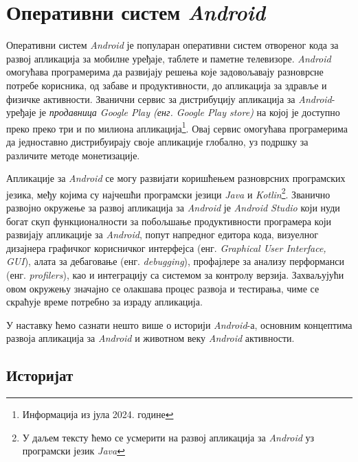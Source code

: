 \documentclass[12pt,oneside]{memoir}
\begin{document}



\chapter{Оперативни систем \textit{Android}} \label{chapter:android-theory}

Оперативни систем \textit{Android} је популаран оперативни систем отвореног кода за развој апликација за мобилне уређаје, таблете и паметне телевизоре. \textit{Android} омогућава програмерима да развијају решења које задовољавају разноврсне потребе корисника, од забаве и продуктивности, до апликација за здравље и физичке активности. Званични сервис за дистрибуцију апликација за \textit{Android}-уређаје је \textit{продавница Google Play (енг. Google Play store)} на којој је доступно преко преко три и по милиона апликација\footnote{Информација из јула 2024. године}. Овај сервис омогућава програмерима да једноставно дистрибуирају своје апликације глобално, уз подршку за различите методе монетизације.

Апликације за \textit{Android} се могу развијати коришћењем разноврсних програмских језика, међу којима су најчешћи програмски језици \textit{Java} и \textit{Kotlin}\footnote{У даљем тексту ћемо се усмерити на развој апликација за \textit{Android} уз програмски језик \textit{Java}}. Званично развојно окружење за развој апликација за \textit{Android} је \textit{Android Studio} \cite{AndroidStudio} који нуди богат скуп функционалности за побољшање продуктивности програмера који развијају апликације за \textit{Android}, попут напредног едитора кода, визуелног дизајнера графичког корисничког интерфејса (енг. \textit{Graphical User Interface, GUI}), алата за дебаговање (енг. \textit{debugging}), профајлере за анализу перформанси (енг. \textit{profilers}), као и интеграцију са системом за контролу верзија. Захваљујући овом окружењу значајно се олакшава процес развоја и тестирања, чиме се скраћује време потребно за израду апликација.

У наставку ћемо сазнати нешто више о историји \textit{Android}-а, основним концептима развоја апликација за \textit{Android} и животном веку \textit{Android} активности.

\section{Историјат}
\end{document}
